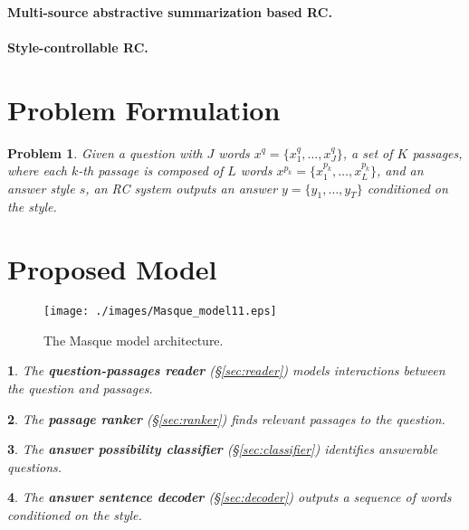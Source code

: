 \documentclass[11pt,a4paper]{article}
\theoremstyle{mydef}
\theoremstyle{myprob}
\newtheorem{problem}{Problem}
\newtheorem{layer1}{}
\begin{document}
\paragraph{Multi-source abstractive summarization based RC.}

\paragraph{Style-controllable RC.}

\section{Problem Formulation}

\begin{problem}
\label{prob:prob}
Given a question with $J$ words $x^q = \{x^q_1, \ldots, x^q_J\}$, a set of $K$ passages, where each $k$-th passage is composed of $L$ words $x^{p_k} = \{x^{p_k}_1, \ldots, x^{p_k}_{L}\}$, and an answer style $s$, an RC system %
outputs an answer $y = \{y_1, \ldots, y_T \}$ conditioned on the style.
\end{problem}

\section{Proposed Model} 

\begin{figure}[t!]
\centering
\texttt{[image: ./images/Masque\_model11.eps]}
\caption{The Masque model architecture.}
\label{fig:model}
\end{figure}

\begin{layer1}
The \textbf{question-passages reader} (\S\ref{sec:reader}) models interactions between the question and passages.
\end{layer1}

\begin{layer1}
The \textbf{passage ranker} (\S\ref{sec:ranker}) finds relevant passages to the question.
\end{layer1}

\begin{layer1}
The \textbf{answer possibility classifier} (\S\ref{sec:classifier}) identifies answerable questions.
\end{layer1}

\begin{layer1}
The \textbf{answer sentence decoder} (\S\ref{sec:decoder}) outputs a sequence of words conditioned on the style.
\end{layer1}
\end{document}
